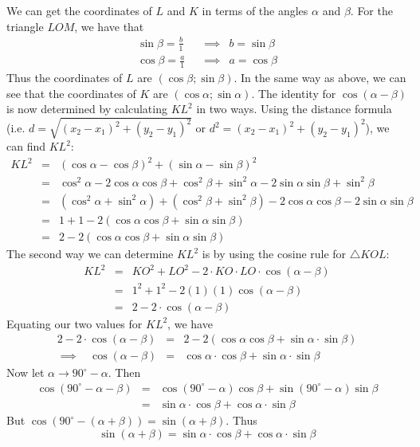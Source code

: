 We can get the coordinates of $L$ and $K$ in terms of the angles $\alpha$ and $\beta$.
For the triangle $LOM$, we have that
\begin{eqnarray*}
\sin\beta =\frac{b}{1} \ \ \ \ &\implies& b=\sin\beta\\
\cos\beta=\frac{a}{1} \ \ \ \ &\implies&a=\cos\beta
\end{eqnarray*}
Thus the coordinates of $L$ are $(\cos\beta;\sin\beta)$. In the same way as above, we can see that the coordinates of $K$ are $(\cos\alpha;\sin\alpha)$.
The identity for $\cos(\alpha-\beta)$ is now determined by calculating $KL^2$ in two ways. Using the distance formula (i.e. $d=\sqrt{(x_2-x_1)^2+(y_2-y_1)^2}$ or $d^2=(x_2-x_1)^2+(y_2-y_1)^2$), we can find $KL^2$:
\begin{eqnarray*}
KL^2&=&(\cos\alpha-\cos\beta)^2+(\sin\alpha-\sin\beta)^2\\
&=&\cos^2\alpha-2\cos\alpha\cos\beta+\cos^2\beta+\sin^2\alpha-2\sin\alpha\sin\beta+\sin^2\beta\\
&=&(\cos^2\alpha+\sin^2\alpha)+(\cos^2\beta+\sin^2\beta)-2\cos\alpha\cos\beta-2\sin\alpha\sin\beta\\
&=&1+1-2(\cos\alpha\cos\beta+\sin\alpha\sin\beta)\\
&=&2-2(\cos\alpha\cos\beta+\sin\alpha\sin\beta)
\end{eqnarray*} 
The second way we can determine $KL^2$ is by using the cosine rule for $\triangle KOL$:
\begin{eqnarray*}
KL^2&=&KO^2+LO^2-2\cdot KO\cdot LO\cdot\cos(\alpha-\beta)\\
&=&1^2+1^2-2(1)(1)\cos(\alpha-\beta)\\
&=&2-2\cdot\cos(\alpha-\beta)
\end{eqnarray*}
Equating our two values for $KL^2$, we have
\begin{eqnarray*}
2-2\cdot\cos(\alpha-\beta)&=&2-2(\cos\alpha\cos\beta+\sin\alpha\cdot\sin\beta)\\
\implies \ \ \ \ \cos(\alpha-\beta)&=&\cos\alpha\cdot\cos\beta+\sin\alpha\cdot\sin\beta
\end{eqnarray*}
Now let $\alpha\to 90^\circ -\alpha$. Then 
\begin{eqnarray*}
\cos(90^\circ-\alpha-\beta)&=&\cos(90^\circ-\alpha)\cos\beta+\sin(90^\circ-\alpha)\sin\beta\\
&=&\sin\alpha\cdot\cos\beta+\cos\alpha\cdot\sin\beta
\end{eqnarray*}
But $\cos(90^\circ-(\alpha+\beta))=\sin(\alpha+\beta)$. Thus 
$$\sin(\alpha+\beta)=\sin\alpha\cdot\cos\beta+\cos\alpha\cdot\sin\beta$$

